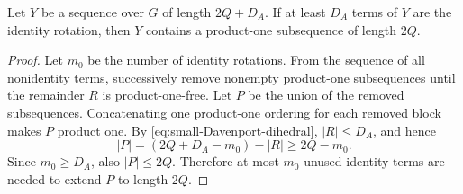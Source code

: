 \begin{lemma}\label{lem:identity-padding}
Let \(Y\) be a sequence over \(G\) of length \(2Q+D_A\). If at least
\(D_A\) terms of \(Y\) are the identity rotation, then \(Y\) contains
a product-one subsequence of length \(2Q\).
\end{lemma}

\begin{proof}
Let \(m_0\) be the number of identity rotations. From the sequence of
all nonidentity terms, successively remove nonempty product-one
subsequences until the remainder \(R\) is product-one-free. Let \(P\)
be the union of the removed subsequences. Concatenating one product-one
ordering for each removed block makes \(P\) product one. By
\eqref{eq:small-Davenport-dihedral}, \(|R|\le D_A\), and hence
\[
  |P|=(2Q+D_A-m_0)-|R|\ge 2Q-m_0.
\]
Since \(m_0\ge D_A\), also \(|P|\le 2Q\). Therefore at most \(m_0\)
unused identity terms are needed to extend \(P\) to length \(2Q\).
\end{proof}
